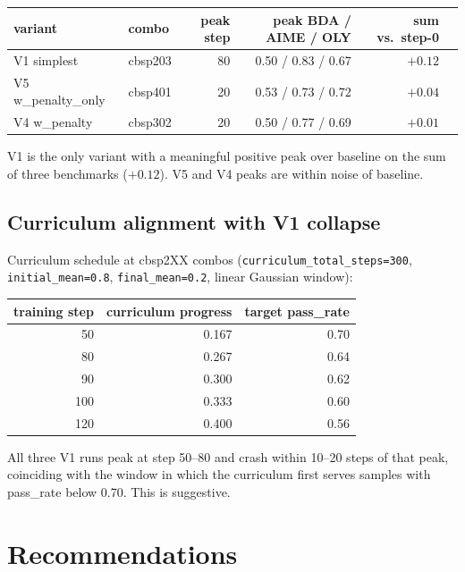\documentclass[10pt]{article}
\begin{document}
\begin{center}
\begin{tabular}{llrrrr}
\toprule
variant              & combo    & peak step & peak BDA / AIME / OLY & sum vs.\ step-0 \\
\midrule
V1 simplest          & cbsp203  & 80        & 0.50 / 0.83 / 0.67     & $+0.12$ \\
V5 w\_penalty\_only  & cbsp401  & 20        & 0.53 / 0.73 / 0.72     & $+0.04$ \\
V4 w\_penalty        & cbsp302  & 20        & 0.50 / 0.77 / 0.69     & $+0.01$ \\
\bottomrule
\end{tabular}
\end{center}

\noindent V1 is the only variant with a meaningful positive peak over
baseline on the sum of three benchmarks ($+0.12$). V5 and V4 peaks
are within noise of baseline.

\subsection{Curriculum alignment with V1 collapse}

Curriculum schedule at cbsp2XX combos
(\texttt{curriculum\_total\_steps=300}, \texttt{initial\_mean=0.8},
\texttt{final\_mean=0.2}, linear Gaussian window):

\begin{center}
\begin{tabular}{rrr}
\toprule
training step & curriculum progress & target pass\_rate \\
\midrule
50   & 0.167  & 0.70 \\
80   & 0.267  & 0.64 \\
90   & 0.300  & 0.62 \\
100  & 0.333  & 0.60 \\
120  & 0.400  & 0.56 \\
\bottomrule
\end{tabular}
\end{center}

\noindent All three V1 runs peak at step 50--80 and crash within 10--20
steps of that peak, coinciding with the window in which the curriculum
first serves samples with pass\_rate below 0.70. This is suggestive.

\section{Recommendations}
\end{document}
